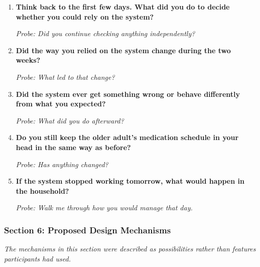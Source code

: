 \begin{enumerate}[resume]
  \item \textbf{Think back to the first few days. What did you do to decide whether you could rely on the system?}

  \textit{Probe: Did you continue checking anything independently?}
  \item \textbf{Did the way you relied on the system change during the two weeks?}

  \textit{Probe: What led to that change?}
  \item \textbf{Did the system ever get something wrong or behave differently from what you expected?}

  \textit{Probe: What did you do afterward?}
  \item \textbf{Do you still keep the older adult's medication schedule in your head in the same way as before?}

  \textit{Probe: Has anything changed?}
  \item \textbf{If the system stopped working tomorrow, what would happen in the household?}

  \textit{Probe: Walk me through how you would manage that day.}
\end{enumerate}

\subsubsection{Section 6: Proposed Design Mechanisms}

\textit{The mechanisms in this section were described as possibilities rather than features participants had used.}

